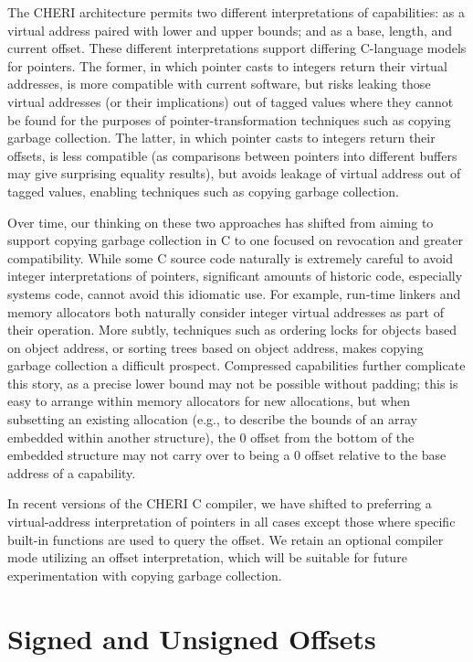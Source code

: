 The CHERI architecture permits two different interpretations of capabilities:
as a virtual address paired with lower and upper bounds; and as a base,
length, and current offset.
These different interpretations support differing C-language models for
pointers.
The former, in which pointer casts to integers return their virtual addresses,  is more compatible with current software, but risks leaking those virtual
addresses (or their implications) out of tagged values where they cannot be
found for the purposes of pointer-transformation techniques such as copying
garbage collection.
The latter, in which pointer casts to integers return their offsets, is less
compatible (as comparisons between pointers into different buffers may give
surprising equality results), but avoids leakage of virtual address out of
tagged values, enabling techniques such as copying garbage collection.

Over time, our thinking on these two approaches has shifted from aiming to
support copying garbage collection in C to one focused on revocation and
greater compatibility.
While some C source code naturally is extremely careful to avoid integer
interpretations of pointers, significant amounts of historic code, especially
systems code, cannot avoid this idiomatic use.
For example, run-time linkers and memory allocators both naturally consider
integer virtual addresses as part of their operation.
More subtly, techniques such as ordering locks for objects based on object
address, or sorting trees based on object address, makes copying garbage
collection a difficult prospect.
Compressed capabilities further complicate this story, as a precise lower
bound may not be possible without padding; this is easy to arrange within
memory allocators for new allocations, but when subsetting an existing
allocation (e.g., to describe the bounds of an array embedded within another
structure), the 0 offset from the bottom of the embedded structure may not
carry over to being a 0 offset relative to the base address of a capability.

In recent versions of the CHERI C compiler, we have shifted to preferring a
virtual-address interpretation of pointers in all cases except those where
specific built-in functions are used to query the offset.
We retain an optional compiler mode utilizing an offset interpretation, which
will be suitable for future experimentation with copying garbage collection.

\section{Signed and Unsigned Offsets}

